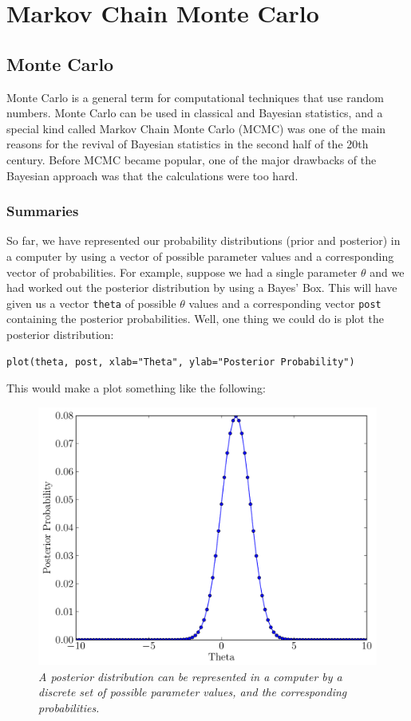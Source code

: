 \chapter{Markov Chain Monte Carlo}
\section{Monte Carlo}
Monte Carlo is a general term for computational techniques that use random
numbers.
Monte Carlo can be used in classical and Bayesian statistics, and a special kind
called Markov Chain Monte Carlo (MCMC) was one of the main reasons
for the revival of Bayesian statistics in the second half of the 20th century.
Before MCMC became popular, one of the major drawbacks of the Bayesian approach
was that the calculations were too hard. 

\subsection{Summaries}
So far, we have represented our probability distributions (prior and posterior)
in a computer by using a vector of possible parameter values and a corresponding
vector of probabilities. For example, suppose we had a single parameter $\theta$
and we had worked out the posterior distribution by using a Bayes' Box. This
will have given us a vector {\tt theta} of possible $\theta$ values and a corresponding
vector {\tt post} containing the posterior probabilities. Well, one thing we could
do is plot the posterior distribution:
\begin{verbatim}
plot(theta, post, xlab="Theta", ylab="Posterior Probability")
\end{verbatim}
This would make a plot something like the following:

\begin{figure}[ht!]
\begin{center}
\includegraphics[scale=0.5]{Figures/normal.pdf}
\caption{\it A posterior distribution can be represented in a computer by a discrete
set of possible parameter values, and the corresponding probabilities.\label{fig:normal}}
\end{center}
\end{figure}


